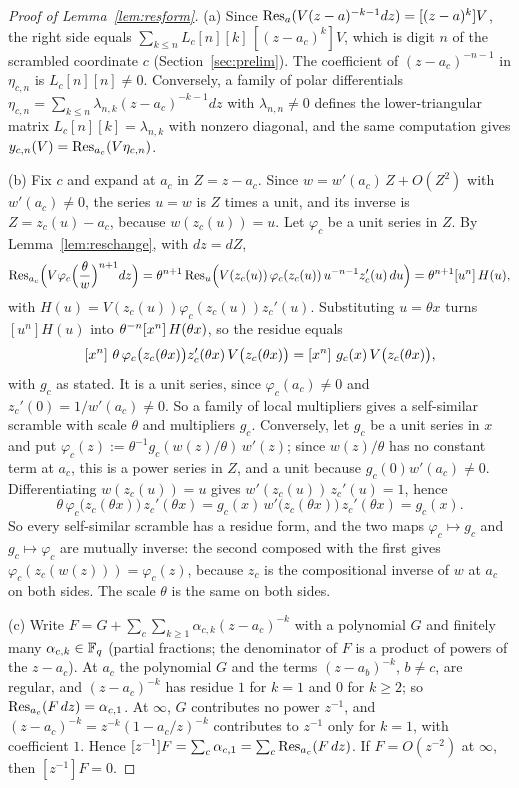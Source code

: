 \begin{proof}[Proof of Lemma~\ref{lem:resform}]
(a) Since $\operatorname{Res}_{a}(V(z-a)^{-k-1}dz)=[(z-a)^k]V$, the right side equals $\sum_{k\le n}L_c[n][k]\,[(z-a_c)^k]V$, which is digit $n$ of the scrambled coordinate $c$ (Section~\ref{sec:prelim}). The coefficient of $(z-a_c)^{-n-1}$ in $\eta_{c,n}$ is $L_c[n][n]\ne0$. Conversely, a family of polar differentials $\eta_{c,n}=\sum_{k\le n}\lambda_{n,k}(z-a_c)^{-k-1}dz$ with $\lambda_{n,n}\ne0$ defines the lower-triangular matrix $L_c[n][k]=\lambda_{n,k}$ with nonzero diagonal, and the same computation gives $y_{c,n}(V)=\operatorname{Res}_{a_c}(V\eta_{c,n})$.

(b) Fix $c$ and expand at $a_c$ in $Z=z-a_c$. Since $w=w'(a_c)\,Z+O(Z^2)$ with $w'(a_c)\ne0$, the series $u=w$ is $Z$ times a unit, and its inverse is $Z=z_c(u)-a_c$, because $w(z_c(u))=u$. Let $\varphi_c$ be a unit series in $Z$. By Lemma~\ref{lem:reschange}, with $dz=dZ$,
\[
\operatorname{Res}_{a_c}\Bigl(V\varphi_c\Bigl(\frac\theta w\Bigr)^{n+1}dz\Bigr)=\theta^{n+1}\operatorname{Res}_u\Bigl(V(z_c(u))\,\varphi_c(z_c(u))\,u^{-n-1}z_c'(u)\,du\Bigr)=\theta^{n+1}[u^n]\,H(u),
\]
with $H(u)=V(z_c(u))\varphi_c(z_c(u))z_c'(u)$. Substituting $u=\theta x$ turns $[u^n]H(u)$ into $\theta^{-n}[x^{n}]\,H(\theta x)$, so the residue equals
\[
[x^{n}]\,\,\theta\,\varphi_c\bigl(z_c(\theta x)\bigr)z_c'(\theta x)\,V\bigl(z_c(\theta x)\bigr)=[x^{n}]\,\,g_c(x)\,V\bigl(z_c(\theta x)\bigr),
\]
with $g_c$ as stated. It is a unit series, since $\varphi_c(a_c)\ne0$ and $z_c'(0)=1/w'(a_c)\ne0$. So a family of local multipliers gives a self-similar scramble with scale $\theta$ and multipliers $g_c$. Conversely, let $g_c$ be a unit series in $x$ and put $\varphi_c(z):=\theta^{-1}g_c(w(z)/\theta)\,w'(z)$; since $w(z)/\theta$ has no constant term at $a_c$, this is a power series in $Z$, and a unit because $g_c(0)w'(a_c)\ne0$. Differentiating $w(z_c(u))=u$ gives $w'(z_c(u))\,z_c'(u)=1$, hence
\[
\theta\,\varphi_c\bigl(z_c(\theta x)\bigr)\,z_c'(\theta x)=g_c(x)\,w'\bigl(z_c(\theta x)\bigr)\,z_c'(\theta x)=g_c(x).
\]
So every self-similar scramble has a residue form, and the two maps $\varphi_c\mapsto g_c$ and $g_c\mapsto\varphi_c$ are mutually inverse: the second composed with the first gives $\varphi_c(z_c(w(z)))=\varphi_c(z)$, because $z_c$ is the compositional inverse of $w$ at $a_c$ on both sides. The scale $\theta$ is the same on both sides.

(c) Write $F=G+\sum_c\sum_{k\ge1}\alpha_{c,k}(z-a_c)^{-k}$ with a polynomial $G$ and finitely many $\alpha_{c,k}\in\mathbb{F}_q$ (partial fractions; the denominator of $F$ is a product of powers of the $z-a_c$). At $a_c$ the polynomial $G$ and the terms $(z-a_b)^{-k}$, $b\ne c$, are regular, and $(z-a_c)^{-k}$ has residue $1$ for $k=1$ and $0$ for $k\ge2$; so $\operatorname{Res}_{a_c}(F\,dz)=\alpha_{c,1}$. At $\infty$, $G$ contributes no power $z^{-1}$, and $(z-a_c)^{-k}=z^{-k}(1-a_c/z)^{-k}$ contributes to $z^{-1}$ only for $k=1$, with coefficient $1$. Hence $[z^{-1}]F=\sum_c\alpha_{c,1}=\sum_c\operatorname{Res}_{a_c}(F\,dz)$. If $F=O(z^{-2})$ at $\infty$, then $[z^{-1}]F=0$.
\end{proof}

